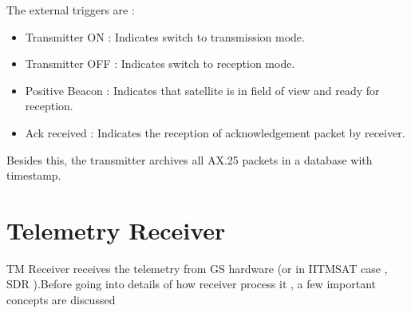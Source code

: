 \documentclass[BTech]{iitmdiss}
\begin{document}
The external triggers are :
\begin{itemize}
\item Transmitter ON : Indicates switch to transmission mode.
\item Transmitter OFF : Indicates switch to reception mode.
\item Positive Beacon : Indicates that satellite is in field of view and ready for reception.
\item Ack received : Indicates the reception of acknowledgement packet by receiver.

\end{itemize}

Besides this, the transmitter archives all AX.25 packets in a database with timestamp.
\section{Telemetry Receiver}
TM Receiver receives the telemetry from GS hardware (or in IITMSAT case , SDR ).Before going into details of how receiver process it , a few important concepts are discussed 
\end{document}
